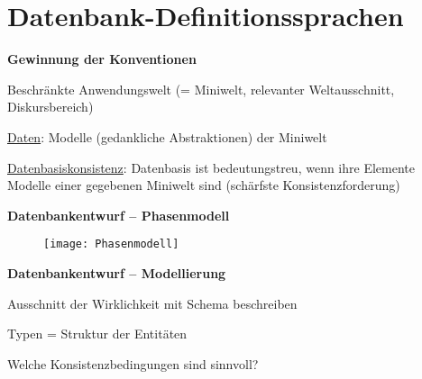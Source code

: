 \section{Datenbank-Definitionssprachen}
\label{sec:definitionssprachen}

\textbf{Gewinnung der Konventionen}
\begin{items}
	\item Beschränkte Anwendungswelt (= Miniwelt, relevanter Weltausschnitt, Diskursbereich)
	\item \underline{Daten}: Modelle (gedankliche Abstraktionen) der Miniwelt
	\item \underline{Datenbasiskonsistenz}: Datenbasis ist bedeutungstreu, wenn ihre Elemente Modelle einer gegebenen Miniwelt sind (schärfste Konsistenzforderung)
\end{items}

\textbf{Datenbankentwurf -- Phasenmodell}
\begin{figure}[H]\centering\label{Phasenmodell}\texttt{[image: Phasenmodell]}\end{figure}

\textbf{Datenbankentwurf -- Modellierung}
\begin{items}
	\item Ausschnitt der Wirklichkeit mit Schema beschreiben
	\item Typen = Struktur der Entitäten
	\item Welche Konsistenzbedingungen sind sinnvoll?
\end{items}
